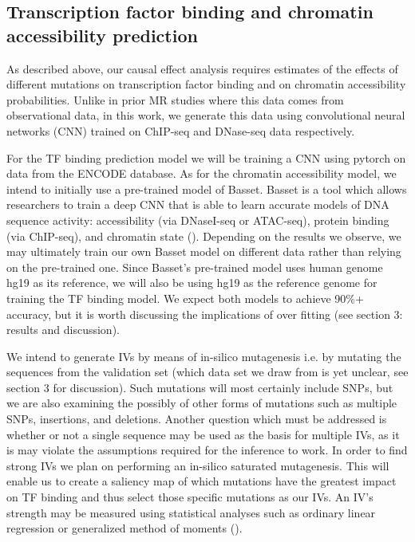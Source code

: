 \documentclass{article}
\begin{document}
\subsection{Transcription factor binding and chromatin accessibility prediction}
As described above, our causal effect analysis requires estimates of the effects of different mutations on transcription factor binding and on chromatin accessibility probabilities. Unlike in prior MR studies where this data comes from observational data, in this work, we generate this data using convolutional neural networks (CNN) trained on ChIP-seq and DNase-seq data respectively. 

For the TF binding prediction model we will be training a CNN using pytorch on data from the ENCODE database. As for the chromatin accessibility model, we intend to initially use a pre-trained model of Basset. Basset is a tool which allows researchers to train a deep CNN that is able to learn accurate models of DNA sequence activity: accessibility (via DNaseI-seq or ATAC-seq), protein binding (via ChIP-seq), and chromatin state  (\cite{kelley2016basset}). Depending on the results we observe, we may ultimately train our own Basset model on different data rather than relying on the pre-trained one. Since Basset's pre-trained model uses human genome hg19 as its reference, we will also be using hg19 as the reference genome for training the TF binding model. We expect both models to achieve 90\%+ accuracy, but it is worth discussing the implications of over fitting (see section 3: results and discussion).

We intend to generate IVs by means of in-silico mutagenesis i.e. by  mutating the sequences from the validation set (which data set we draw from is yet unclear, see section 3 for discussion). Such mutations will most certainly include SNPs, but we are also examining the possibly of other forms of mutations such as multiple SNPs, insertions, and deletions. Another question which must be addressed is whether or not a single sequence may be used as the basis for multiple IVs, as it is may violate the assumptions required for the inference to work. In order to find strong IVs we plan on  performing an in-silico saturated mutagenesis. This will enable us to create a saliency map of which mutations have the greatest impact on TF binding and thus select those specific mutations as our IVs. An IV's strength may be measured using statistical analyses such as ordinary linear regression or generalized method of moments (\cite{st0030}).
\end{document}
